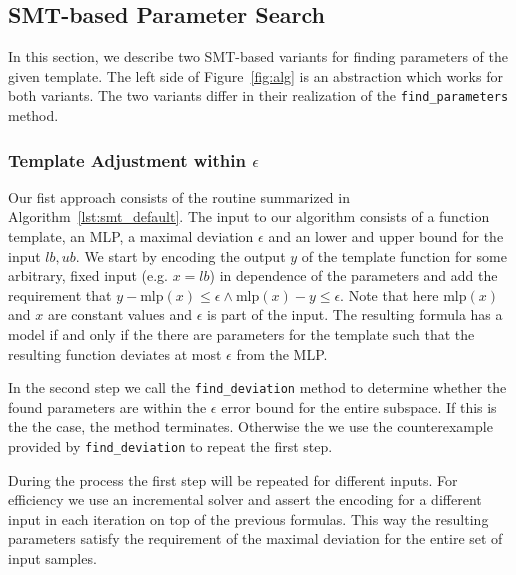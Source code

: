 \subsection{SMT-based Parameter Search}
    \label{subsec:smt}
    In this section, we describe two SMT-based variants for finding parameters of the given template. The left side of Figure~\ref{fig:alg} is an abstraction which works for both variants. The two variants differ in their realization of the \lstinline{find_parameters} method.
    \subsubsection{Template Adjustment within $\epsilon$}
    \label{subsubsec:smt1}
        \begin{tcolorbox}[arc=0mm, colback=rwthlightgray, outer arc=0mm, colframe = white, size=small, bottom=-9mm]
            
        \end{tcolorbox}
        \vspace{9mm}
        Our fist approach consists of the routine summarized in Algorithm~\ref{lst:smt_default}.
        The input to our algorithm consists of a function template, an MLP, a maximal deviation $\epsilon$ and an lower and upper bound for the input $lb, ub$. We start by encoding the output $y$ of the template function for some arbitrary, fixed input (e.g. $x=lb$) in dependence of the parameters and add the requirement that $y-\text{mlp}(x) \leq \epsilon \land \text{mlp}(x)-y \leq \epsilon$. Note that here $\text{mlp}(x)$ and $x$ are constant values and $\epsilon$ is part of the input. The resulting formula has a model if and only if the there are parameters for the template such that the resulting function deviates at most $\epsilon$ from the MLP.\par
        In the second step we call the \lstinline{find_deviation} method to determine whether the found parameters are within the $\epsilon$ error bound for the entire subspace. If this is the the case, the method terminates. Otherwise the we use the counterexample provided by \lstinline{find_deviation} to repeat the first step.\par
        During the process the first step will be repeated for different inputs. For efficiency we use an incremental solver and assert the encoding for a different input in each iteration on top of the previous formulas. This way the resulting parameters satisfy the requirement of the maximal deviation for the entire set of input samples.
        
